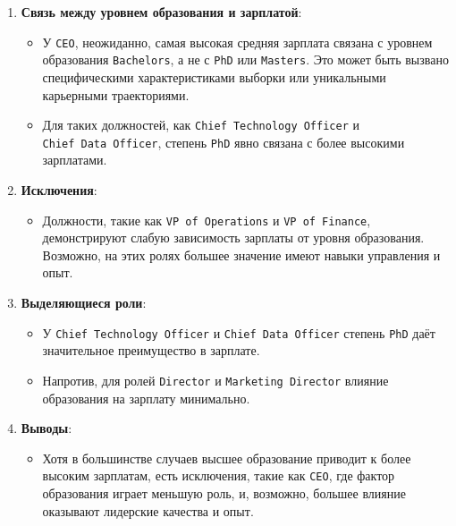 \documentclass[
]{article}
\providecommand{\tightlist}{%
  \setlength{\itemsep}{0pt}\setlength{\parskip}{0pt}}
\begin{document}
\begin{enumerate}
\def\labelenumi{\arabic{enumi}.}
\tightlist
\item
  \textbf{Связь между уровнем образования и зарплатой}:

  \begin{itemize}
  \tightlist
  \item
    У \texttt{CEO}, неожиданно, самая высокая средняя зарплата связана с
    уровнем образования \texttt{Bachelor\textquotesingle{}s}, а не с
    \texttt{PhD} или \texttt{Master\textquotesingle{}s}. Это может быть
    вызвано специфическими характеристиками выборки или уникальными
    карьерными траекториями.
  \item
    Для таких должностей, как \texttt{Chief\ Technology\ Officer} и
    \texttt{Chief\ Data\ Officer}, степень \texttt{PhD} явно связана с
    более высокими зарплатами.
  \end{itemize}
\item
  \textbf{Исключения}:

  \begin{itemize}
  \tightlist
  \item
    Должности, такие как \texttt{VP\ of\ Operations} и
    \texttt{VP\ of\ Finance}, демонстрируют слабую зависимость зарплаты
    от уровня образования. Возможно, на этих ролях большее значение
    имеют навыки управления и опыт.
  \end{itemize}
\item
  \textbf{Выделяющиеся роли}:

  \begin{itemize}
  \tightlist
  \item
    У \texttt{Chief\ Technology\ Officer} и
    \texttt{Chief\ Data\ Officer} степень \texttt{PhD} даёт значительное
    преимущество в зарплате.
  \item
    Напротив, для ролей \texttt{Director} и \texttt{Marketing\ Director}
    влияние образования на зарплату минимально.
  \end{itemize}
\item
  \textbf{Выводы}:

  \begin{itemize}
  \tightlist
  \item
    Хотя в большинстве случаев высшее образование приводит к более
    высоким зарплатам, есть исключения, такие как \texttt{CEO}, где
    фактор образования играет меньшую роль, и, возможно, большее влияние
    оказывают лидерские качества и опыт.
  \end{itemize}
\end{enumerate}
\end{document}
